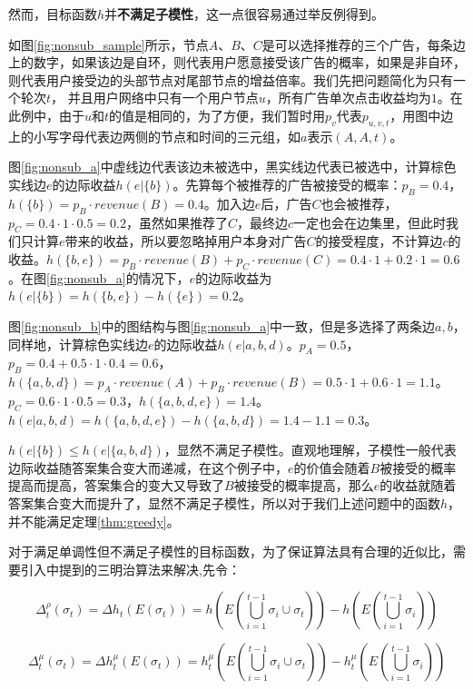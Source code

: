 然而，目标函数$h$并{\bfseries 不满足子模性}，这一点很容易通过举反例得到。

如图\ref{fig:nonsub_sample}所示，节点$A$、$B$、$C$是可以选择推荐的三个广告，每条边上的数字，如果该边是自环，则代表用户愿意接受该广告的概率，如果是非自环，则代表用户接受边的头部节点对尾部节点的增益倍率。我们先把问题简化为只有一个轮次$t$， 并且用户网络中只有一个用户节点$u$，所有广告单次点击收益均为$1$。在此例中，由于$u$和$t$的值是相同的，为了方便，我们暂时用$p_{v}$代表$p_{u,v,t}$，用图中边上的小写字母代表边两侧的节点和时间的三元组，如$a$表示$(A,A,t)$。

图\ref{fig:nonsub_a}中虚线边代表该边未被选中，黑实线边代表已被选中，计算棕色实线边$e$的边际收益$h(e|\{b\})$。先算每个被推荐的广告被接受的概率：$p_B=0.4$，$h(\{b\})=p_B \cdot revenue(B)=0.4$。加入边$e$后，广告$C$也会被推荐，$p_C=0.4 \cdot 1 \cdot 0.5=0.2$，虽然如果推荐了$C$，最终边$c$一定也会在边集里，但此时我们只计算$e$带来的收益，所以要忽略掉用户本身对广告$C$的接受程度，不计算边$c$的收益。$h(\{b,e\})=p_B\cdot revenue(B)+p_C\cdot revenue(C)=0.4\cdot 1+0.2\cdot 1=0.6$。在图\ref{fig:nonsub_a}的情况下，$e$的边际收益为$h(e|\{b\})=h(\{b,e\})-h(\{e\})=0.2$。

图\ref{fig:nonsub_b}中的图结构与图\ref{fig:nonsub_a}中一致，但是多选择了两条边$a,b$，同样地，计算棕色实线边$e$的边际收益$h(e|{a,b,d})$。$p_A=0.5$，$p_B=0.4+0.5\cdot 1\cdot 0.4=0.6$，$h(\{a,b,d\})=p_A\cdot revenue(A)+p_B\cdot revenue(B)=0.5\cdot 1 + 0.6 \cdot 1 = 1.1$。$p_C=0.6 \cdot 1\cdot 0.5 = 0.3$，$h(\{a,b,d,e\})=1.4$。$h(e|{a,b,d})=h(\{a,b,d,e\})-h(\{a,b,d\})=1.4-1.1=0.3$。

$h(e|\{b\})\le h(e|\{a,b,d\})$，显然不满足子模性。直观地理解，子模性一般代表边际收益随答案集合变大而递减，在这个例子中，$e$的价值会随着$B$被接受的概率提高而提高，答案集合的变大又导致了$B$被接受的概率提高，那么$e$的收益就随着答案集合变大而提升了，显然不满足子模性，所以对于我们上述问题中的函数$h$，并不能满足定理\ref{thm:greedy}。

对于满足单调性但不满足子模性的目标函数，为了保证算法具有合理的近似比，需要引入\parencite{sandwich}中提到的三明治算法来解决,先令：

\begin{equation}
\Delta_t^\rho(\sigma_t)=\Delta h_t(E(\sigma_t))=h(E(\bigcup_{i=1}^{t-1}{\sigma_i} \cup \sigma_t)) - h(E(\bigcup_{i=1}^{t-1}{\sigma_i}))
\end{equation}

\begin{equation}
\Delta_t^\mu(\sigma_t)=\Delta h_t^\mu(E(\sigma_t))=h_t^\mu(E(\bigcup_{i=1}^{t-1}{\sigma_i} \cup \sigma_t)) - h_t^\mu(E(\bigcup_{i=1}^{t-1}{\sigma_i}))
\end{equation}

